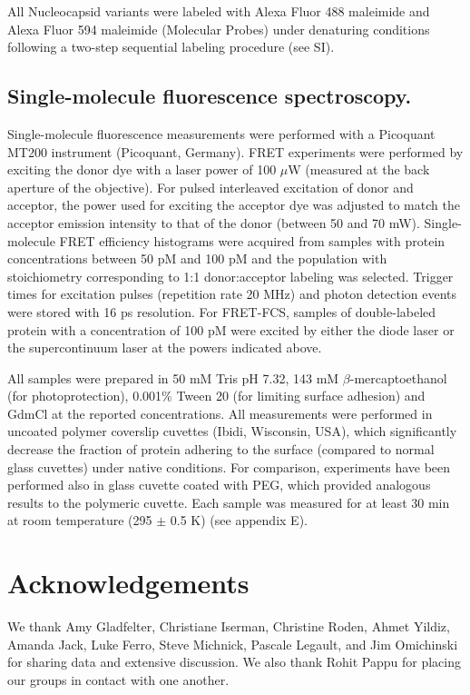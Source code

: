 \documentclass[../main.tex]{subfiles}
\begin{document}
        All Nucleocapsid variants were labeled with Alexa Fluor 488 maleimide and Alexa Fluor 594 maleimide (Molecular Probes) under denaturing conditions following a two-step sequential labeling procedure (see SI). 

    \subsection{Single-molecule fluorescence spectroscopy.}
        Single-molecule fluorescence measurements were performed with a Picoquant MT200 instrument (Picoquant, Germany). FRET experiments were performed by exciting the donor dye with a laser power of 100 $\mu$W (measured at the back aperture of the objective). For pulsed interleaved excitation of donor and acceptor, the power used for exciting the acceptor dye was adjusted to match the acceptor emission intensity to that of the donor (between 50 and 70 mW). Single-molecule FRET efficiency histograms were acquired from samples with protein concentrations between 50 pM and 100 pM and the population with stoichiometry corresponding to 1:1 donor:acceptor labeling was selected. Trigger times for excitation pulses (repetition rate 20 MHz) and photon detection events were stored with 16 ps resolution. For FRET-FCS, samples of double-labeled protein with a concentration of 100 pM were excited by either the diode laser or the supercontinuum laser at the powers indicated above.

        All samples were prepared in 50 mM Tris pH 7.32, 143 mM $\beta$-mercaptoethanol (for photoprotection), 0.001\% Tween 20 (for limiting surface adhesion) and GdmCl at the reported concentrations. All measurements were performed in uncoated polymer coverslip cuvettes (Ibidi, Wisconsin, USA), which significantly decrease the fraction of protein adhering to the surface (compared to normal glass cuvettes) under native conditions. For comparison, experiments have been performed also in glass cuvette coated with PEG, which provided analogous results to the polymeric cuvette. Each sample was measured for at least 30 min at room temperature (295 $\pm$ 0.5 K) (see appendix E).

    \section{Acknowledgements}
        We thank Amy Gladfelter, Christiane Iserman, Christine Roden, Ahmet Yildiz, Amanda Jack, Luke Ferro, Steve Michnick, Pascale Legault, and Jim Omichinski for sharing data and extensive discussion. We also thank Rohit Pappu for placing our groups in contact with one another.
\end{document}
